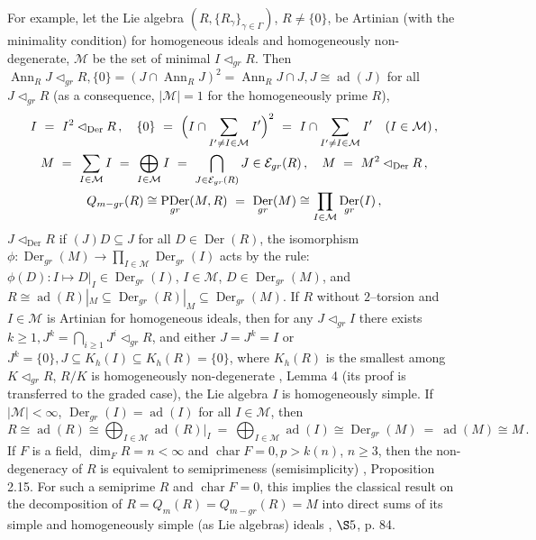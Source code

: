 \documentclass[a4paper,11pt]{article}
\DeclareMathOperator{\ad}{ad}
\DeclareMathOperator{\Ch}{char}
\DeclareMathOperator{\Der}{Der}
\DeclareMathOperator{\Ann}{Ann}
\DeclareMathOperator{\PDer}{PDer}
\begin{document}
For example, let the Lie algebra ${(R, \{R_{\gamma}\}_{\gamma\in \Gamma})}$, 
${R\ne \{0\}}$, be Artinian (with the minimality condition) for homogeneous 
ideals and homogeneously non-degenerate, $\mathcal{M}$ be the set of minimal 
${I\lhd_{gr} R}$. Then ${\Ann_R J\lhd_{gr} R, 
\{0\}=(J\cap \Ann_R J)^2=\Ann_R J\cap J, J\cong \ad(J)}$ for all 
${J\lhd_{gr} R}$ (as a consequence, ${|\mathcal{M}|=1}$ for the homogeneously 
prime $R$), 
\begin{gather*}
I\ =\ I^2\lhd_{\Der} R\,,\quad 
\{0\}\ =\ \Bigl(I\cap \sum_{I'\ne I\in \mathcal{M}} I'\Bigr)^2\ =\ 
I\cap \sum_{I'\ne I\in \mathcal{M}} I'\quad (I\in \mathcal{M})\,,
\\ 
M\ =\ \sum_{I\in \mathcal{M}} I\ =\ \bigoplus_{I\in \mathcal{M}} I\ =\ 
\bigcap_{J\in \mathcal{E}_{gr}(R)} J\in \mathcal{E}_{gr}(R)\,,\quad 
M\ =\ M^2\lhd_{\Der} R\,,
\\
Q_{m-gr}(R)\cong \PDer_{gr}(M, R)\ =\ \Der_{gr}(M)\cong 
\prod_{I\in \mathcal{M}} \Der_{gr}(I)\,,
\end{gather*}
${J\lhd_{\Der} R}$ if ${(J) D\subseteq J}$ for all ${D\in \Der(R)}$, 
the isomorphism ${\phi: \Der_{gr}(M)\longrightarrow 
\prod\limits_{I\in \mathcal{M}} \Der_{gr}(I)}$ acts by the rule: 
${\phi(D): I\longmapsto D|_I\in \Der_{gr}(I)}$, ${I\in \mathcal{M}}$, 
${D\in \Der_{gr}(M)}$, and $R\cong \ad(R)|_M\subseteq 
\Der_{gr}(R)|_M\subseteq \Der_{gr}(M)$. 
If $R$ without $2$--torsion and ${I\in \mathcal{M}}$ is Artinian for 
homogeneous ideals, then for any ${J\lhd_{gr} I}$ there exists 
${k\geq 1, J^k=\bigcap\limits_{i\geq 1} J^i\lhd_{gr} R}$, and either 
${J=J^k=I}$ or ${J^k=\{0\}, J\subseteq K_h(I)\subseteq K_h(R)=\{0\}}$, 
where $K_h(R)$ is the smallest among ${K\lhd_{gr} R}$, $R/K$ is homogeneously 
non-degenerate \cite{Zel}, Lemma 4 (its proof is transferred to the 
graded case), the Lie algebra $I$ is homogeneously simple. 
If ${|\mathcal{M}|< \infty}$, ${\Der_{gr}(I)=\ad(I)}$ for all ${I\in \mathcal{M}}$, then 
\[
R\cong \ad(R) \cong \bigoplus_{I\in \mathcal{M}} \ad(R)|_I\ =\ 
\bigoplus_{I\in \mathcal{M}} \ad(I)\cong \Der_{gr}(M)\ =\ \ad(M)\cong M\,.
\]
If $F$ is a field, ${\dim_F R=n< \infty}$ and ${\Ch F=0, p> k(n)}$, 
${n\geq 3}$, then the non-degeneracy of $R$ is equivalent to semiprimeness 
(semisimplicity) \cite{Gol2}, Proposition 2.15. For such a semiprime 
$R$ and ${\Ch F=0}$, this implies the classical result on the decomposition 
of $R=Q_m(R)=Q_{m-gr}(R)=M$ into direct sums of its simple and 
homogeneously simple (as Lie algebras) ideals \cite{JacL}, $\S 5$, p. 84.
               
\end{document}
